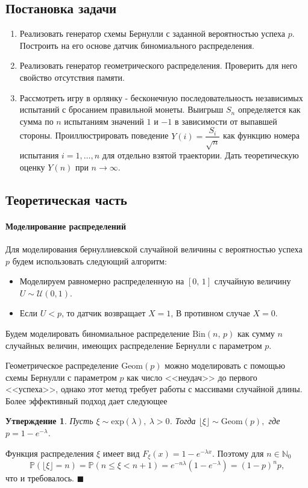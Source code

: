 \documentclass[16pt]{article}
\newtheorem{St}{Утверждение}
\newenvironment{Proof}{\par\noindent{\bf Доказательство.}}{\hfill$\scriptstyle\blacksquare$}
\newcommand{\Prb}{\mathbb{P}}
\begin{document}
\subsection{Постановка задачи}
\begin{enumerate}
	\item  Реализовать генератор схемы Бернулли с заданной вероятностью успеха $p$. Построить на его основе датчик биномиального распределения.
	\item Реализовать генератор геометрического распределения. Проверить для него свойство отсутствия памяти.
	\item Рассмотреть игру в орлянку - бесконечную последовательность независимых испытаний с бросанием правильной монеты. Выигрыш $S_n$ определяется как сумма по $n$ испытаниям значений $1$ и $-1$ в зависимости от выпавшей стороны. Проиллюстрировать поведение $Y(i) = \dfrac{S_i}{\sqrt{n}}$ как функцию номера испытания $i = 1, \ldots, n$ для отдельно взятой траектории. Дать теоретическую оценку $Y(n)$ при $n \to \infty$.
\end{enumerate}

\subsection{Теоретическая часть}
\paragraph{Моделирование распределений}
Для моделирования бернуллиевской случайной величины с вероятностью успеха $p$ будем использовать следующий алгоритм:
\begin{itemize}
	\item Моделируем равномерно распределенную на $[0,\, 1]$ случайную величину $U \sim \mathcal{U}(0, 1)$.
	\item Если $U < p$, то датчик возвращает $X = 1$, В противном случае $X = 0$.
\end{itemize}

Будем моделировать биномиальное распределение $\mathrm{Bin}(n,\,p)$ как сумму $n$ случайных величин, имеющих распределение Бернулли с параметром $p$.

Геометрическое распределение $\mathrm{Geom}(p)$ можно моделировать с помощью схемы Бернулли с параметром $p$ как число <<неудач>> до первого <<успеха>>, однако этот метод требует работы с массивами случайной длины. Более эффективный подход дает следующее
\begin{St}
Пусть $\xi \sim \mathrm{exp}(\lambda), \ \lambda > 0$. Тогда $\lfloor \xi \rfloor \sim \mathrm{Geom}(p),$ где $p = 1 - e^{-\lambda}$.
\end{St}
\begin{Proof}

Функция распределения $\xi$ имеет вид
$F_\xi(x) = 1 - e^{-\lambda x}$. Поэтому для $n \in \mathbb{N}_0$
$$\Prb(\lfloor \xi \rfloor = n) = \Prb(n \leq \xi < n + 1) = e^{-n\lambda}(1 - e^{-\lambda}) = (1 - p)^np,$$
что и требовалось.
\end{Proof}
\end{document}
